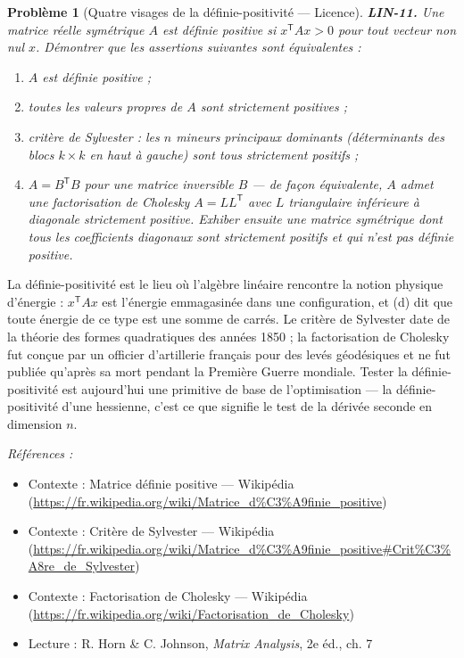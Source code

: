 \documentclass[11pt]{article}
\newtheorem{problem}{Problème}
\newenvironment{refs}{\par\small\noindent\emph{Références :}\begin{itemize}\setlength\itemsep{0pt}}{\end{itemize}\normalsize}
\begin{document}
\bigskip

\begin{problem}[{Quatre visages de la définie-positivité --- Licence}]
\textbf{LIN-11.} Une matrice réelle symétrique $A$ est \textit{définie positive}
si $x^{\mathsf{T}} A x > 0$ pour tout vecteur non nul $x$. Démontrer que les assertions
suivantes sont équivalentes :
\begin{enumerate}
\item[(a)] $A$ est définie positive ;
\item[(b)] toutes les valeurs propres de $A$ sont strictement positives ;
\item[(c)] critère de Sylvester : les $n$ mineurs principaux dominants (déterminants des blocs
$k \times k$ en haut à gauche) sont tous strictement positifs ;
\item[(d)] $A = B^{\mathsf{T}} B$ pour une matrice inversible
$B$ --- de façon équivalente, $A$ admet une factorisation de Cholesky $A = LL^{\mathsf{T}}$ avec
$L$ triangulaire inférieure à diagonale strictement positive. Exhiber ensuite une matrice symétrique
dont tous les coefficients diagonaux sont strictement positifs et qui n'est \textit{pas} définie
positive.
\end{enumerate}

\end{problem}

\noindent La définie-positivité est le lieu où l'algèbre linéaire rencontre la notion
physique d'énergie : $x^{\mathsf{T}} A x$ est l'énergie emmagasinée dans une configuration, et (d)
dit que toute énergie de ce type est une somme de carrés. Le critère de Sylvester date de la théorie
des formes quadratiques des années 1850 ; la factorisation de Cholesky fut conçue par un officier
d'artillerie français pour des levés géodésiques et ne fut publiée qu'après sa mort pendant la
Première Guerre mondiale. Tester la définie-positivité est aujourd'hui une primitive de base de
l'optimisation --- la définie-positivité d'une hessienne, c'est ce que signifie le \og{} test de la dérivée
seconde \fg{} en dimension $n$.

\begin{refs}
\item Contexte : Matrice définie positive --- Wikipédia (\url{https://fr.wikipedia.org/wiki/Matrice_d%C3%A9finie_positive})
\item Contexte : Critère de Sylvester --- Wikipédia (\url{https://fr.wikipedia.org/wiki/Matrice_d%C3%A9finie_positive#Crit%C3%A8re_de_Sylvester})
\item Contexte : Factorisation de Cholesky --- Wikipédia (\url{https://fr.wikipedia.org/wiki/Factorisation_de_Cholesky})
\item Lecture : R. Horn \& C. Johnson, \textit{Matrix Analysis}, 2e éd., ch. 7
\end{refs}
\end{document}
